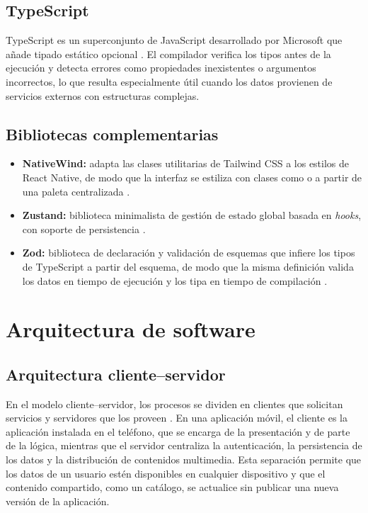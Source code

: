 \subsection{TypeScript}

TypeScript es un superconjunto de JavaScript desarrollado por Microsoft que
añade tipado estático opcional \citep{typescript}. El compilador verifica los
tipos antes de la ejecución y detecta errores como propiedades inexistentes o
argumentos incorrectos, lo que resulta especialmente útil cuando los datos
provienen de servicios externos con estructuras complejas.

\subsection{Bibliotecas complementarias}

\begin{itemize}
    \item \textbf{NativeWind:} adapta las clases utilitarias de Tailwind CSS a
    los estilos de React Native, de modo que la interfaz se estiliza con
    clases como  o  a partir de
    una paleta centralizada \citep{nativewind}.
    \item \textbf{Zustand:} biblioteca minimalista de gestión de estado global
    basada en \emph{hooks}, con soporte de persistencia
    \citep{zustand}.
    \item \textbf{Zod:} biblioteca de declaración y validación de esquemas que
    infiere los tipos de TypeScript a partir del esquema, de modo que la misma
    definición valida los datos en tiempo de ejecución y los tipa en tiempo de
    compilación \citep{zod}.
\end{itemize}

\section{Arquitectura de software}
\label{sec:mt-arquitectura}

\subsection{Arquitectura cliente--servidor}

En el modelo cliente--servidor, los procesos se dividen en clientes que
solicitan servicios y servidores que los proveen \citep{tanenbaum2007}. En una
aplicación móvil, el cliente es la aplicación instalada en el teléfono, que se
encarga de la presentación y de parte de la lógica, mientras que el servidor
centraliza la autenticación, la persistencia de los datos y la distribución de
contenidos multimedia. Esta separación permite que los datos de un usuario
estén disponibles en cualquier dispositivo y que el contenido compartido, como
un catálogo, se actualice sin publicar una nueva versión de la aplicación.

